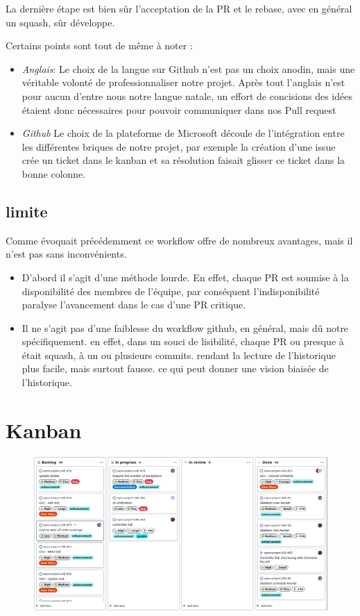 \documentclass[a4paper,french,final]{memoir}
\begin{document}
La dernière étape est bien sûr l'acceptation de la PR et le rebase, avec en général un squash, sûr développe.


Certains points sont tout de même à noter :
\begin{itemize}
    \item \emph{Anglais}: Le choix de la langue sur Github n'est pas un choix anodin, mais une véritable volonté de professionnaliser notre projet. Après tout l'anglais n'est pour aucun d'entre nous notre langue natale, un effort de concisions des idées étaient donc nécessaires pour pouvoir communiquer dans nos Pull request
    \item \emph{Github} Le choix de la plateforme de Microsoft découle de l'intégration entre les différentes briques de notre projet,
    par exemple la création d'une issue crée un ticket dans le kanban et sa résolution faisait glisser ce ticket dans la bonne colonne.
\end{itemize}


\subsection{limite}
Comme évoquait précédemment ce workflow offre de nombreux avantages, mais il n'est pas sans inconvénients.
\begin{itemize}
    \item D'abord il s'agit d'une méthode lourde. En effet, chaque PR est soumise à la disponibilité des membres de l'équipe,
    par conséquent l'indisponibilité paralyse l'avancement dans le cas d'une PR critique.
    \item Il ne s'agit pas d'une faiblesse du workflow github, en général, mais dû notre spécifiquement.
    en effet, dans un souci de lisibilité, chaque PR ou presque à était squash, à un ou plusieurs commits.
    rendant la lecture de l'historique plus facile, mais surtout fausse. ce qui peut donner une vision biaisée de l'historique.
\end{itemize}
\newpage
\section{Kanban}
\begin{figure}[h!]
    \centering
    \includegraphics[width=0.9\linewidth]{figures/kanban.png}
\end{figure}
\hspace{2cm}
\end{document}
